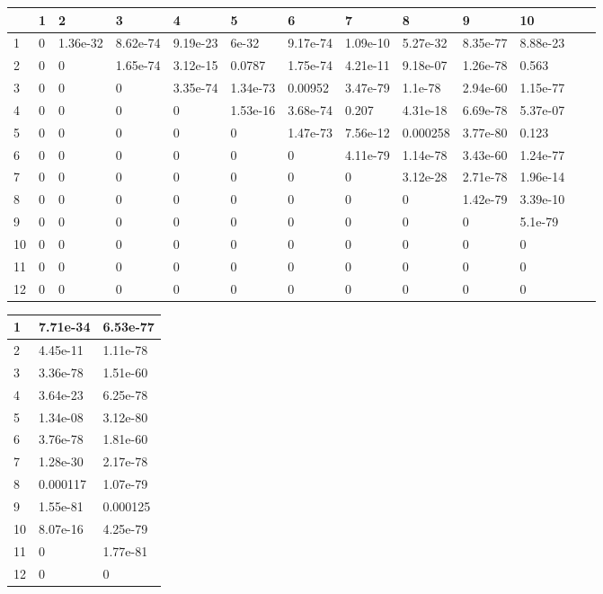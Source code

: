 \begin{table}[h]
\begin{tabular}{|l||l|l|l|l|l|l|l|l|l|l|l|l|}
\hline
 & 1 & 2 & 3 & 4 & 5 & 6 & 7 & 8 & 9 & 10 \\ \hline
\hline
1 & 0 & 1.36e-32 & 8.62e-74 & 9.19e-23 & 6e-32 & 9.17e-74 & 1.09e-10 & 5.27e-32 & 8.35e-77 & 8.88e-23 \\ \hline
2 & 0 & 0 & 1.65e-74 & 3.12e-15 & 0.0787 & 1.75e-74 & 4.21e-11 & 9.18e-07 & 1.26e-78 & 0.563 \\ \hline
3 & 0 & 0 & 0 & 3.35e-74 & 1.34e-73 & 0.00952 & 3.47e-79 & 1.1e-78 & 2.94e-60 & 1.15e-77 \\ \hline
4 & 0 & 0 & 0 & 0 & 1.53e-16 & 3.68e-74 & 0.207 & 4.31e-18 & 6.69e-78 & 5.37e-07 \\ \hline
5 & 0 & 0 & 0 & 0 & 0 & 1.47e-73 & 7.56e-12 & 0.000258 & 3.77e-80 & 0.123 \\ \hline
6 & 0 & 0 & 0 & 0 & 0 & 0 & 4.11e-79 & 1.14e-78 & 3.43e-60 & 1.24e-77 \\ \hline
7 & 0 & 0 & 0 & 0 & 0 & 0 & 0 & 3.12e-28 & 2.71e-78 & 1.96e-14 \\ \hline
8 & 0 & 0 & 0 & 0 & 0 & 0 & 0 & 0 & 1.42e-79 & 3.39e-10 \\ \hline
9 & 0 & 0 & 0 & 0 & 0 & 0 & 0 & 0 & 0 & 5.1e-79 \\ \hline
10 & 0 & 0 & 0 & 0 & 0 & 0 & 0 & 0 & 0 & 0 \\ \hline
11 & 0 & 0 & 0 & 0 & 0 & 0 & 0 & 0 & 0 & 0 \\ \hline
12 & 0 & 0 & 0 & 0 & 0 & 0 & 0 & 0 & 0 & 0 \\ \hline
\end{tabular}
\end{table}

\begin{table}[h]
\begin{tabular}{|l||l|l|}
\hline
1 & 7.71e-34 & 6.53e-77 \\ \hline
2 & 4.45e-11 & 1.11e-78 \\ \hline
3 & 3.36e-78 & 1.51e-60 \\ \hline
4 & 3.64e-23 & 6.25e-78 \\ \hline
5 & 1.34e-08 & 3.12e-80 \\ \hline
6 & 3.76e-78 & 1.81e-60 \\ \hline
7 & 1.28e-30 & 2.17e-78 \\ \hline
8 & 0.000117 & 1.07e-79 \\ \hline
9 & 1.55e-81 & 0.000125 \\ \hline
10 & 8.07e-16 & 4.25e-79 \\ \hline
11 & 0 & 1.77e-81 \\ \hline
12 & 0 & 0 \\ \hline
\end{tabular}
\end{table}

